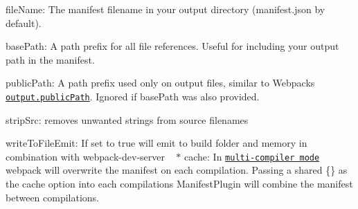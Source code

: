\begin{DoxyItemize}
\item {\ttfamily file\+Name}\+: The manifest filename in your output directory ({\ttfamily manifest.\+json} by default).
\item {\ttfamily base\+Path}\+: A path prefix for all file references. Useful for including your output path in the manifest.
\item {\ttfamily public\+Path}\+: A path prefix used only on output files, similar to Webpack\textquotesingle{}s \href{https://github.com/webpack/docs/wiki/configuration#outputpublicpath}{\tt output.\+public\+Path}. Ignored if {\ttfamily base\+Path} was also provided.
\item {\ttfamily strip\+Src}\+: removes unwanted strings from source filenames
\item {\ttfamily write\+To\+File\+Emit}\+: If set to {\ttfamily true} will emit to build folder and memory in combination with {\ttfamily webpack-\/dev-\/server} ~\newline
$\ast$ {\ttfamily cache}\+: In \href{https://github.com/webpack/webpack/tree/master/examples/multi-compiler}{\tt multi-\/compiler mode} webpack will overwrite the manifest on each compilation. Passing a shared {\ttfamily \{\}} as the {\ttfamily cache} option into each compilation\textquotesingle{}s Manifest\+Plugin will combine the manifest between compilations. 
\end{DoxyItemize}